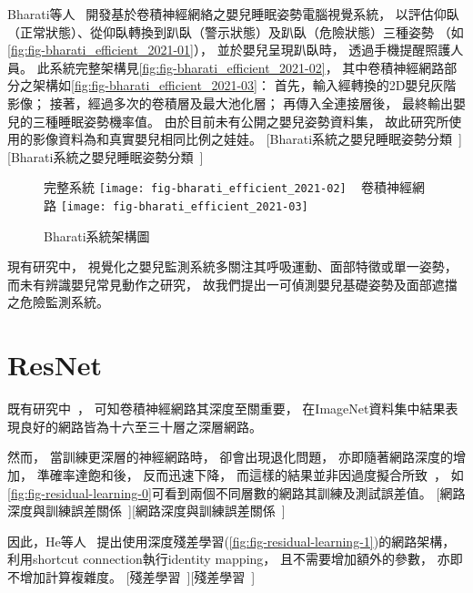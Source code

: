 \documentclass[class=NCU_thesis, crop=false]{standalone}
\begin{document}
Bharati等人~\cite{bharati_efficient_2021}
開發基於卷積神經網絡之嬰兒睡眠姿勢電腦視覺系統，
以評估仰臥（正常狀態）、從仰臥轉換到趴臥（警示狀態）及趴臥（危險狀態）三種姿勢
（如\cref{fig:fig-bharati_efficient_2021-01}），
並於嬰兒呈現趴臥時，
透過手機提醒照護人員。
此系統完整架構見\cref{fig:fig-bharati_efficient_2021-02}，
其中卷積神經網路部分之架構如\cref{fig:fig-bharati_efficient_2021-03}：
首先，輸入經轉換的2D嬰兒灰階影像；
接著，經過多次的卷積層及最大池化層；
再傳入全連接層後，
最終輸出嬰兒的三種睡眠姿勢機率值。
由於目前未有公開之嬰兒姿勢資料集，
故此研究所使用的影像資料為和真實嬰兒相同比例之娃娃。
[Bharati系統之嬰兒睡眠姿勢分類~\cite{bharati_efficient_2021}][Bharati系統之嬰兒睡眠姿勢分類~\cite{bharati_efficient_2021}]
\begin{figure}[!hbt]
    \centering
    \subcaptionbox
        {完整系統
        \label{fig:fig-bharati_efficient_2021-02}}
        {\texttt{[image: fig-bharati\_efficient\_2021-02]}}
    ~
    \subcaptionbox
        {卷積神經網路
        \label{fig:fig-bharati_efficient_2021-03}}
        {\texttt{[image: fig-bharati\_efficient\_2021-03]}}
    \caption{Bharati系統架構圖~\cite{bharati_efficient_2021}}
    \label{fig:fig-bharati_efficient_2021}
\end{figure}

現有研究中，
視覺化之嬰兒監測系統多關注其呼吸運動、面部特徵或單一姿勢，
而未有辨識嬰兒常見動作之研究，
故我們提出一可偵測嬰兒基礎姿勢及面部遮擋之危險監測系統。

\section{ResNet}
既有研究中~\cite{simonyan_very_2015, szegedy_going_2015, ioffe_batch_2015}，
可知卷積神經網路其深度至關重要，
在ImageNet資料集中結果表現良好的網路皆為十六至三十層之深層網路。

然而，
當訓練更深層的神經網路時，
卻會出現退化問題，
亦即隨著網路深度的增加，
準確率達飽和後，
反而迅速下降，
而這樣的結果並非因過度擬合所致~\cite{he_convolutional_2015, srivastava_highway_2015}，
如\cref{fig:fig-residual-learning-0}可看到兩個不同層數的網路其訓練及測試誤差值。
[網路深度與訓練誤差關係~\cite{he_deep_2016}][網路深度與訓練誤差關係~\cite{he_deep_2016}]

因此，He等人~\cite{he_deep_2016}
提出使用深度殘差學習(\cref{fig:fig-residual-learning-1})的網路架構，
利用shortcut connection執行identity mapping，
且不需要增加額外的參數，
亦即不增加計算複雜度。
[殘差學習~\cite{he_deep_2016}][殘差學習~\cite{he_deep_2016}]
\end{document}
